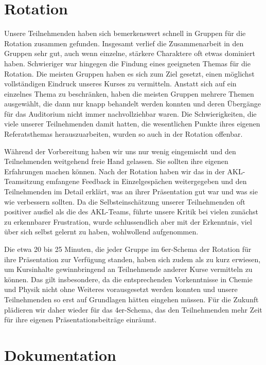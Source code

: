 \documentclass{scrartcl}
\begin{document}
\section*{Rotation}

Unsere Teilnehmenden haben sich bemerkenswert schnell in Gruppen f{\"u}r die Rotation zusammen gefunden. Insgesamt verlief die Zusammenarbeit in den Gruppen sehr gut, auch wenn einzelne, st{\"a}rkere Charaktere oft etwas dominiert haben. Schwieriger war hingegen die Findung eines geeigneten Themas f{\"u}r die Rotation. Die meisten Gruppen haben es sich zum Ziel gesetzt, einen m{\"o}glichst vollst{\"a}ndigen Eindruck unseres Kurses zu vermitteln. Anstatt sich auf ein einzelnes Thema zu beschr{\"a}nken, haben die meisten Gruppen mehrere Themen ausgew{\"a}hlt, die dann nur knapp behandelt werden konnten und deren {\"U}berg{\"a}nge f{\"u}r das Auditorium nicht immer nachvollziehbar waren. Die Schwierigkeiten, die viele unserer Teilnehmenden damit hatten, die wesentlichen Punkte ihres eigenen Referatsthemas herauszuarbeiten, wurden so auch in der Rotation offenbar.\medskip

W{\"a}hrend der Vorbereitung haben wir uns nur wenig eingemischt und den Teilnehmenden weitgehend freie Hand gelassen. Sie sollten ihre eigenen Erfahrungen machen k{\"o}nnen. Nach der Rotation haben wir das in der AKL-Teamsitzung emfangene Feedback in Einzelgesp{\"a}chen weitergegeben und den Teilnehmenden im Detail erkl{\"a}rt, was an ihrer Pr{\"a}sentation gut war und was sie wie verbessern sollten. Da die Selbsteinsch{\"a}tzung unserer Teilnehmenden oft positiver ausfiel als die des AKL-Teams, f{\"u}hrte unsere Kritik bei vielen zun{\"a}chst zu erkennbarer Frustration, wurde schlussendlich aber mit der Erkenntnis, viel {\"u}ber sich selbst gelernt zu haben, wohlwollend aufgenommen.\medskip

Die etwa 20 bis 25 Minuten, die jeder Gruppe im 6er-Schema der Rotation f{\"u}r ihre Pr{\"a}sentation zur Verf{\"u}gung standen, haben sich zudem als zu kurz erwiesen, um Kursinhalte gewinnbringend an Teilnehmende anderer Kurse vermitteln zu k{\"o}nnen. Das gilt insbesondere, da die entsprechenden Vorkenntnisse in Chemie und Physik nicht ohne Weiteres vorausgesetzt werden konnten und unsere Teilnehmenden so erst auf Grundlagen h{\"a}tten eingehen m{\"u}ssen. F{\"u}r die Zukunft pl{\"a}dieren wir daher wieder f{\"u}r das 4er-Schema, das den Teilnehmenden mehr Zeit f{\"u}r ihre eigenen Pr{\"a}sentationsbeitr{\"a}ge einr{\"a}umt.\bigskip

\section*{Dokumentation}
\end{document}
